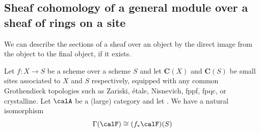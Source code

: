 \subsection{Sheaf cohomology of a general module over a sheaf of rings on a site}




















We can describe the sections of a sheaf over an object by the direct image from the object to the final object, if it exists.




\begin{corollary}
    Let $f: X \to S$ be a scheme over a scheme $S$ and let $\mathbf{C}(X)$ and $\mathbf{C}(S)$ be small sites associated to $X$ and $S$ respectively, equipped with any common Grothendieck topologies such as Zariski, étale, Nisnevich, fppf, fpqc, or crystalline. Let $\calA$ be a (large) category and let . We have a natural isomorphism
    $$\Gamma(\calF) \cong (f_* \calF)(S)$$ 
\end{corollary}





